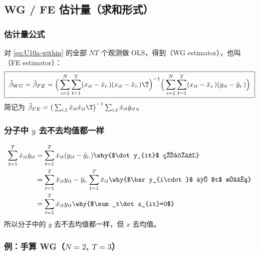 \subsection{WG / FE 估计量（求和形式）}

\subsubsection{估计量公式}

对 \eqref{eq:U10a-within} 的全部 $NT$ 个观测做 OLS，得到（WG estimator），也叫（FE estimator）：
\begin{equation}\label{eq:U10a-fe-sum}
\boxed{\ \hat\beta_{WG}=\hat\beta_{FE}=\Big(\sum_{i=1}^N\sum_{t=1}^T(x_{it}-\bar x_{i\cdot})(x_{it}-\bar x_{i\cdot})\T\Big)^{-1}\Big(\sum_{i=1}^N\sum_{t=1}^T(x_{it}-\bar x_{i\cdot})(y_{it}-\bar y_{i\cdot})\Big)\ }
\end{equation}
简记为 $\hat\beta_{FE}=\big(\sum_{i,t}\dot x_{it}\dot x_{it}\T\big)^{-1}\sum_{i,t}\dot x_{it}\dot y_{it}$。

\subsubsection{分子中 \texorpdfstring{$y$}{y} 去不去均值都一样}

\begin{align*}
\sum_{t=1}^T\dot x_{it}\dot y_{it} &= \sum_{t=1}^T\dot x_{it}(y_{it}-\bar y_{i\cdot}) \why{$\dot y_{it}$ 的定义}\\
&= \sum_{t=1}^T\dot x_{it}y_{it}-\bar y_{i\cdot}\sum_{t=1}^T\dot x_{it} \why{$\bar y_{i\cdot}$ 与 $t$ 无关}\\
&= \sum_{t=1}^T\dot x_{it}y_{it} \why{$\sum_t\dot x_{it}=0$}
\end{align*}
所以分子中的 $y$ 去不去均值都一样，但 $x$ 去均值。

\subsubsection{例：手算 WG（\texorpdfstring{$N=2$, $T=3$}{N=2, T=3}）}

